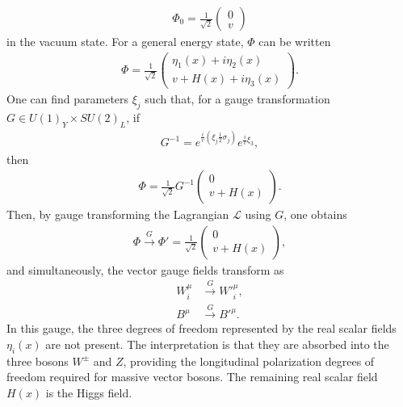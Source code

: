 \documentclass[twoside,english]{uiofysmaster}
\begin{document}
\begin{align}
	\Phi_0 = \frac{1}{\sqrt{2}} \begin{pmatrix}
		0 \\ v
	\end{pmatrix}
\end{align}
in the vacuum state. For a general energy state, $\Phi$ can be written
\begin{align}
	\Phi = \frac{1}{\sqrt{2}} \begin{pmatrix}
		\eta_1(x) + i\eta_2(x) \\
		v + H(x) + i\eta_3(x)
	\end{pmatrix}.
\end{align}
One can find parameters $\xi_j$ such that, for a gauge transformation $G \in U(1)_Y\times SU(2)_L$, if
\begin{align}
	G^{-1} = e^{\frac{i}{v}\left(\xi_j\frac{1}{2}\sigma_j\right)} e^{\frac{i}{v} \xi_3},
\end{align}
then
\begin{align}
	\Phi = \frac{1}{\sqrt{2}} G^{-1} \begin{pmatrix}
		0 \\ v + H(x)
	\end{pmatrix}.
\end{align}
Then, by gauge transforming the Lagrangian $\mathcal{L}$ using $G$, one obtains
\begin{align}
	\Phi \overset{G}{\to} \Phi' = \frac{1}{\sqrt{2}}\begin{pmatrix}
		0 \\ v + H(x)
	\end{pmatrix},
\end{align}
and simultaneously, the vector gauge fields transform as
\begin{align}
	W^\mu_i &\overset{G}{\to} W'^\mu_i ,\label{eq:SSB_gauge_transformation}\\
	B^\mu &\overset{G}{\to} B'^\mu .\nonumber
\end{align}
In this gauge, the three degrees of freedom represented by the real scalar fields $\eta_i(x)$ are not present. The interpretation is that they are absorbed into the three bosons $W^\pm$ and $Z$, providing the longitudinal polarization degrees of freedom required for massive vector bosons. The remaining real scalar field $H(x)$ is the Higgs field.
\end{document}

